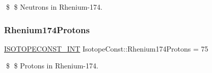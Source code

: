 \$ \$ Neutrons in Rhenium-\/174. \mbox{\label{group___isotope_const-_rhenium-_re174_ga2be3d306d67ec8ab0458896b3b43af35}} 
\subsubsection{\texorpdfstring{Rhenium174\+Protons}{Rhenium174Protons}}
{\footnotesize\ttfamily \mbox{\hyperlink{group___isotope_const-_macros_ga5f18360b3e99483a35c32d789e62621c}{I\+S\+O\+T\+O\+P\+E\+C\+O\+N\+S\+T\+\_\+\+I\+NT}} Isotope\+Const\+::\+Rhenium174\+Protons = 75}

\$ \$ Protons in Rhenium-\/174. 